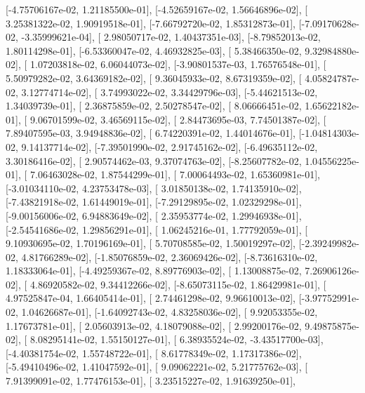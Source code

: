 \documentclass{article}
\begin{document}
       [-4.75706167e-02,  1.21185500e-01],
       [-4.52659167e-02,  1.56646896e-02],
       [ 3.25381322e-02,  1.90919518e-01],
       [-7.66792720e-02,  1.85312873e-01],
       [-7.09170628e-02, -3.35999621e-04],
       [ 2.98050717e-02,  1.40437351e-03],
       [-8.79852013e-02,  1.80114298e-01],
       [-6.53360047e-02,  4.46932825e-03],
       [ 5.38466350e-02,  9.32984880e-02],
       [ 1.07203818e-02,  6.06044073e-02],
       [-3.90801537e-03,  1.76576548e-01],
       [ 5.50979282e-02,  3.64369182e-02],
       [ 9.36045933e-02,  8.67319359e-02],
       [ 4.05824787e-02,  3.12774714e-02],
       [ 3.74993022e-02,  3.34429796e-03],
       [-5.44621513e-02,  1.34039739e-01],
       [ 2.36875859e-02,  2.50278547e-02],
       [ 8.06666451e-02,  1.65622182e-01],
       [ 9.06701599e-02,  3.46569115e-02],
       [ 2.84473695e-03,  7.74501387e-02],
       [ 7.89407595e-03,  3.94948836e-02],
       [ 6.74220391e-02,  1.44014676e-01],
       [-1.04814303e-02,  9.14137714e-02],
       [-7.39501990e-02,  2.91745162e-02],
       [-6.49635112e-02,  3.30186416e-02],
       [ 2.90574462e-03,  9.37074763e-02],
       [-8.25607782e-02,  1.04556225e-01],
       [ 7.06463028e-02,  1.87544299e-01],
       [ 7.00064493e-02,  1.65360981e-01],
       [-3.01034110e-02,  4.23753478e-03],
       [ 3.01850138e-02,  1.74135910e-02],
       [-7.43821918e-02,  1.61449019e-01],
       [-7.29129895e-02,  1.02329298e-01],
       [-9.00156006e-02,  6.94883649e-02],
       [ 2.35953774e-02,  1.29946938e-01],
       [-2.54541686e-02,  1.29856291e-01],
       [ 1.06245216e-01,  1.77792059e-01],
       [ 9.10930695e-02,  1.70196169e-01],
       [ 5.70708585e-02,  1.50019297e-02],
       [-2.39249982e-02,  4.81766289e-02],
       [-1.85076859e-02,  2.36069426e-02],
       [-8.73616310e-02,  1.18333064e-01],
       [-4.49259367e-02,  8.89776903e-02],
       [ 1.13008875e-02,  7.26906126e-02],
       [ 4.86920582e-02,  9.34412266e-02],
       [-8.65073115e-02,  1.86429981e-01],
       [ 4.97525847e-04,  1.66405414e-01],
       [ 2.74461298e-02,  9.96610013e-02],
       [-3.97752991e-02,  1.04626687e-01],
       [-1.64092743e-02,  4.83258036e-02],
       [ 9.92053355e-02,  1.17673781e-01],
       [ 2.05603913e-02,  4.18079088e-02],
       [ 2.99200176e-02,  9.49875875e-02],
       [ 8.08295141e-02,  1.55150127e-01],
       [ 6.38935524e-02, -3.43517700e-03],
       [-4.40381754e-02,  1.55748722e-01],
       [ 8.61778349e-02,  1.17317386e-02],
       [-5.49410496e-02,  1.41047592e-01],
       [ 9.09062221e-02,  5.21775762e-03],
       [ 7.91399091e-02,  1.77476153e-01],
       [ 3.23515227e-02,  1.91639250e-01],
\end{document}

